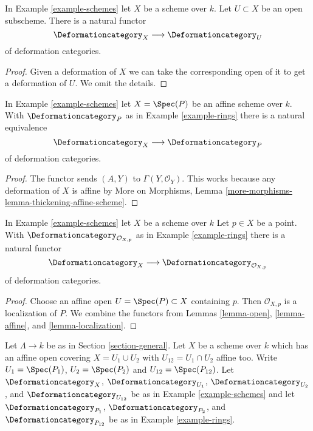\begin{lemma}
\label{lemma-open}
In Example \ref{example-schemes} let $X$ be a scheme over $k$.
Let $U \subset X$ be an open subscheme.
There is a natural functor
$$
\Deformationcategory_X \longrightarrow \Deformationcategory_U
$$
of deformation categories.
\end{lemma}

\begin{proof}
Given a deformation of $X$ we can take the corresponding open
of it to get a deformation of $U$. We omit the details.
\end{proof}

\begin{lemma}
\label{lemma-affine}
In Example \ref{example-schemes} let $X = \Spec(P)$ be an
affine scheme over $k$. With $\Deformationcategory_P$ as in
Example \ref{example-rings} there is a natural equivalence
$$
\Deformationcategory_X \longrightarrow \Deformationcategory_P
$$
of deformation categories.
\end{lemma}

\begin{proof}
The functor sends $(A, Y)$ to $\Gamma(Y, \mathcal{O}_Y)$.
This works because
any deformation of $X$ is affine by
More on Morphisms, Lemma \ref{more-morphisms-lemma-thickening-affine-scheme}.
\end{proof}

\begin{lemma}
\label{lemma-local-ring}
In Example \ref{example-schemes} let $X$ be a scheme over $k$
Let $p \in X$ be a point. With $\Deformationcategory_{\mathcal{O}_{X, p}}$
as in Example \ref{example-rings} there is a natural functor
$$
\Deformationcategory_X
\longrightarrow
\Deformationcategory_{\mathcal{O}_{X, p}}
$$
of deformation categories.
\end{lemma}

\begin{proof}
Choose an affine open $U = \Spec(P) \subset X$ containing $p$.
Then $\mathcal{O}_{X, p}$ is a localization of $P$. We combine
the functors from
Lemmas \ref{lemma-open}, \ref{lemma-affine}, and \ref{lemma-localization}.
\end{proof}

\begin{situation}
\label{situation-glueing}
Let $\Lambda \to k$ be as in Section \ref{section-general}.
Let $X$ be a scheme over $k$ which has an affine open covering
$X = U_1 \cup U_2$ with $U_{12} = U_1 \cap U_2$ affine too.
Write $U_1 = \Spec(P_1)$, $U_2 = \Spec(P_2)$ and $U_{12} = \Spec(P_{12})$.
Let $\Deformationcategory_X$, $\Deformationcategory_{U_1}$,
$\Deformationcategory_{U_2}$, and $\Deformationcategory_{U_{12}}$
be as in Example \ref{example-schemes} and let
$\Deformationcategory_{P_1}$, $\Deformationcategory_{P_2}$, and
$\Deformationcategory_{P_{12}}$ be as in Example \ref{example-rings}.
\end{situation}

